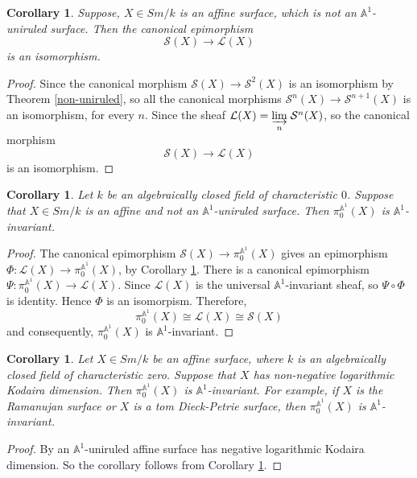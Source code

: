 \documentclass[11pt, reqno]{amsart}
\theoremstyle{plain}
\newtheorem{corollary}[thm]{Corollary}
\theoremstyle{definition}
\newcommand{\A}{{\mathbb A}}
\begin{document}
\begin{corollary} \label{termination}
Suppose, $X \in Sm/k$ is an affine surface, which is not an $\A^1$-uniruled surface. Then the canonical epimorphism 
$$\mathcal{S}(X) \to \mathcal{L}(X)$$
is an isomorphism.
\end{corollary}
\begin{proof}
Since the canonical morphism $\mathcal{S}(X) \to \mathcal{S}^2(X)$ is an isomorphism by Theorem \ref{non-uniruled}, so all the canonical morphisms $\mathcal{S}^n(X) \to \mathcal{S}^{n+1}(X)$ is an isomorphism, for every $n$. 
Since the sheaf $\mathcal{L}(X) =  \underset{n}{\varinjlim} \; \mathcal{S}^n(X)$, 
so the canonical morphism
$$\mathcal{S}(X) \to \mathcal{L}(X)$$
is an isomorphism. 
\end{proof}
\begin{corollary} \label{invariant non-uniruled}
Let $k$ be an algebraically closed field of characteristic $0$. Suppose that $X \in Sm/k$ is an affine and not an $\mathbb{A}^1$-uniruled surface. Then $\pi_0^{\mathbb{A}^1}(X)$ is $\mathbb{A}^1$-invariant.
\end{corollary}
\begin{proof}
The canonical epimorphism $\mathcal{S}(X) \to \pi_0^{\mathbb{A}^1}(X)$ gives an epimorphism $\Phi: \mathcal{L}(X) \to \pi_0^{\mathbb{A}^1}(X)$, by Corollary \ref{termination}. There is a canonical epimorphism $\Psi: \pi_0^{\mathbb{A}^1}(X) \to \mathcal{L}(X)$. Since $\mathcal{L}(X)$ is the universal $\mathbb{A}^1$-invariant sheaf, so $\Psi \circ \Phi$ is identity. Hence $\Phi$ is an isomorpism.
Therefore,
$$\pi_0^{\mathbb{A}^1}(X) \cong \mathcal{L}(X) \cong \mathcal{S}(X)$$
and consequently, $\pi_0^{\mathbb{A}^1}(X)$ is $\mathbb{A}^1$-invariant.
\end{proof}
\begin{corollary}
Let $X \in Sm/k$ be an affine surface, where $k$ is an algebraically closed field of characteristic zero. Suppose that $X$ has non-negative logarithmic Kodaira dimension. Then $\pi_0^{\mathbb{A}^1}(X)$ is $\mathbb{A}^1$-invariant. For example, if $X$ is the Ramanujan surface \cite[Section 3]{ra} or $X$ is a tom Dieck-Petrie surface, then $\pi_0^{\mathbb{A}^1}(X)$ is $\mathbb{A}^1$-invariant.
\end{corollary}
\begin{proof}
By \cite[Lemma 1.8]{russell} an $\mathbb{A}^1$-uniruled affine surface has negative logarithmic Kodaira dimension. So the corollary follows from Corollary \ref{invariant non-uniruled}.
\end{proof}
\end{document}
